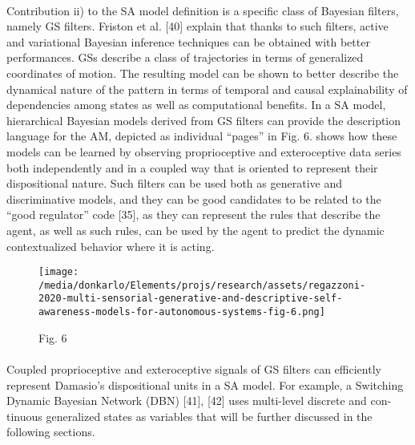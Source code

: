 \documentclass{article}
\begin{document}
		\paragraph{}Contribution ii) to the SA model definition is a specific class
		of Bayesian filters, namely GS filters. Friston et al. [40] explain
		that thanks to such filters, active and variational Bayesian
		inference techniques can be obtained with better performances.
		GSs describe a class of trajectories in terms of generalized
		coordinates of motion. The resulting model can be shown to
		better describe the dynamical nature of the pattern in terms
		of temporal and causal explainability of dependencies among
		states as well as computational benefits. In a SA model,
		hierarchical Bayesian models derived from GS filters can
		provide the description language for the AM, depicted as
		individual “pages” in Fig. 6. \citet{regazzoni-2020-multi-sensorial-generative-and-descriptive-self-awareness-models-for-autonomous-systems} shows how these models
		can be learned by observing proprioceptive and exteroceptive
		data series both independently and in a coupled way that is
		oriented to represent their dispositional nature. Such filters can
		be used both as generative and discriminative models, and they
		can be good candidates to be related to the “good regulator”
		code [35], as they can represent the rules that describe the
		agent, as well as such rules, can be used by the agent to predict
		the dynamic contextualized behavior where it is acting.
		\begin{figure*}
			\centering
			\texttt{[image: /media/donkarlo/Elements/projs/research/assets/regazzoni-2020-multi-sensorial-generative-and-descriptive-self-awareness-models-for-autonomous-systems-fig-6.png]}
			\caption{\citet{regazzoni-2020-multi-sensorial-generative-and-descriptive-self-awareness-models-for-autonomous-systems} Fig. 6}
			\label{fig:regazzoni-2020-multi-sensorial-generative-and-descriptive-self-awareness-models-for-autonomous-systems-fig-6.png}
		\end{figure*}
		\paragraph{} Coupled proprioceptive and exteroceptive signals of GS
		filters can efficiently represent Damasio’s dispositional units
		in a SA model. For example, a Switching Dynamic Bayesian
		Network (DBN) [41], [42] uses multi-level discrete and con-
		tinuous generalized states as variables that will be further
		discussed in the following sections.
\end{document}
